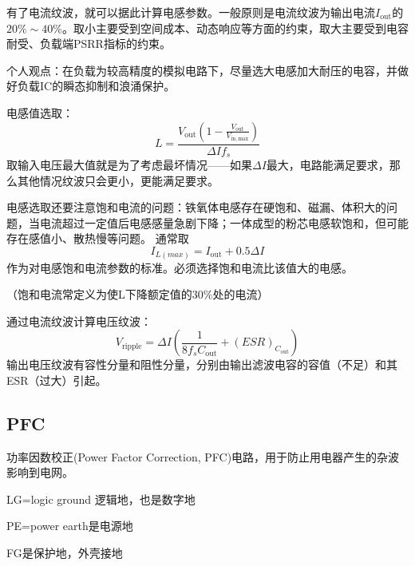     有了电流纹波，就可以据此计算电感参数。一般原则是电流纹波为输出电流$I_\mathrm{out}$的$20\% \sim 40\%$。取小主要受到空间成本、动态响应等方面的约束，取大主要受到电容耐受、负载端PSRR指标的约束。


    个人观点：在负载为较高精度的模拟电路下，尽量选大电感加大耐压的电容，并做好负载IC的瞬态抑制和浪涌保护。


    电感值选取：
    \begin{equation}
        L=\frac{V_\mathrm{out}\left(1-\frac{V_\mathrm{out}}{V_\mathrm{in,max}}\right)}{\Delta I f_s}
    \end{equation}
    取输入电压最大值就是为了考虑最坏情况——如果$\Delta I$最大，电路能满足要求，那么其他情况纹波只会更小，更能满足要求。


    电感选取还要注意饱和电流的问题：铁氧体电感存在硬饱和、磁漏、体积大的问题，当电流超过一定值后电感感量急剧下降；一体成型的粉芯电感软饱和，但可能存在感值小、散热慢等问题。
    通常取
    \begin{equation}
        I_{L(max)}=I_\mathrm{out}+0.5 \Delta I
    \end{equation}
    作为对电感饱和电流参数的标准。必须选择饱和电流比该值大的电感。
    \begin{center}
        （饱和电流常定义为使L下降额定值的30\%处的电流）
    \end{center}


    通过电流纹波计算电压纹波：
    \begin{equation}
        V_\mathrm{ripple}=\Delta I\left(\frac{1}{8f_sC_\mathrm{out}}+(ESR)_{C_\mathrm{out}}\right)
    \end{equation}
    输出电压纹波有容性分量和阻性分量，分别由输出滤波电容的容值（不足）和其ESR（过大）引起。

    \subsection{PFC}
    功率因数校正(Power Factor Correction, PFC)电路，用于防止用电器产生的杂波影响到电网。
    
    LG=logic ground 逻辑地，也是数字地
    
    
    PE=power earth是电源地

    FG是保护地，外壳接地

